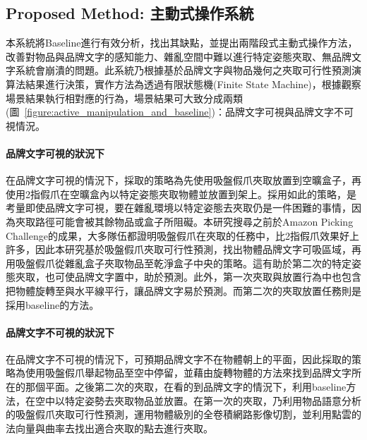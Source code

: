 \subsection{Proposed Method: 主動式操作系統}
本系統將Baseline進行有效分析，找出其缺點，並提出兩階段式主動式操作方法，改善對物品與品牌文字的感知能力、雜亂空間中難以進行特定姿態夾取、無品牌文字系統會崩潰的問題。此系統乃根據基於品牌文字與物品幾何之夾取可行性預測演算法結果進行決策，實作方法為透過有限狀態機(Finite State Machine)，根據觀察場景結果執行相對應的行為，場景結果可大致分成兩類(圖~\ref{figure:active_manipulation_and_baseline})：品牌文字可視與品牌文字不可視情況。



\paragraph{品牌文字可視的狀況下}
在品牌文字可視的情況下，採取的策略為先使用吸盤假爪夾取放置到空曠盒子，再使用2指假爪在空曠盒內以特定姿態夾取物體並放置到架上。採用如此的策略，是考量即使品牌文字可視，要在雜亂環境以特定姿態去夾取仍是一件困難的事情，因為夾取路徑可能會被其餘物品或盒子所阻礙。本研究搜尋之前於Amazon Picking Challenge的成果，大多隊伍都證明吸盤假爪在夾取的任務中，比2指假爪效果好上許多，因此本研究基於吸盤假爪夾取可行性預測，找出物體品牌文字可吸區域，再用吸盤假爪從雜亂盒子夾取物品至乾淨盒子中央的策略。這有助於第二次的特定姿態夾取，也可使品牌文字置中，助於預測。此外，第一次夾取與放置行為中也包含把物體旋轉至與水平線平行，讓品牌文字易於預測。而第二次的夾取放置任務則是採用baseline的方法。

\paragraph{品牌文字不可視的狀況下}
在品牌文字不可視的情況下，可預期品牌文字不在物體朝上的平面，因此採取的策略為使用吸盤假爪舉起物品至空中停留，並藉由旋轉物體的方法來找到品牌文字所在的那個平面。之後第二次的夾取，在看的到品牌文字的情況下，利用baseline方法，在空中以特定姿勢去夾取物品並放置。在第一次的夾取，乃利用物品語意分析的吸盤假爪夾取可行性預測，運用物體級別的全卷積網路影像切割，並利用點雲的法向量與曲率去找出適合夾取的點去進行夾取。

